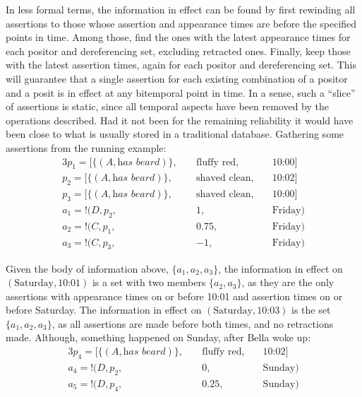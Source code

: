 \documentclass[sfsidenotes,nobib,twoside,symmetric]{tufte-handout}
\newcommand{\assert}{\text{!}}
\begin{document}
In less formal terms, the information in effect can be found by first rewinding all assertions to those whose assertion and appearance times are before the specified points in time. Among those, find the ones with the latest appearance times for each positor and dereferencing set, excluding retracted ones. Finally, keep those with the latest assertion times, again for each positor and dereferencing set. This will guarantee that a single assertion for each existing combination of a positor and a posit is in effect at any bitemporal point in time. In a sense, such a \enquote{slice} of assertions is static, since all temporal aspects have been removed by the operations described. Had it not been for the remaining reliability it would have been close to what is usually stored in a traditional database. Gathering some assertions from the running example:
\begin{alignat*}{3}
p_{1} = [\{(A, \textit{has beard})\},\;&& \textrm{fluffy red},\;&& \textrm{10:00}]  \\
p_{2} = [\{(A, \textit{has beard})\},\;&& \textrm{shaved clean},\;&& \textrm{10:02}]  \\
p_{3} = [\{(A, \textit{has beard})\},\;&& \textrm{shaved clean},\;&& \textrm{10:00}]  \\
a_1 = \assert(D, p_{2},\;&& 1,\;&& \textrm{Friday}) \\
a_2 = \assert(C, p_{1},\;&& 0.75,\;&& \textrm{Friday}) \\
a_3 = \assert(C, p_{3},\;&& -1,\;&& \textrm{Friday}) 
\end{alignat*}

Given the body of information above, $\{a_1, a_2, a_3\}$, the information in effect on $(\textrm{Saturday}, \textrm{10:01})$ is a set with two members $\{a_2, a_3\}$, as they are the only assertions with appearance times on or before 10:01 and assertion times on or before Saturday. The information in effect on $(\textrm{Saturday}, \textrm{10:03})$ is the set $\{a_1, a_2, a_3\}$, as all assertions are made before both times, and no retractions made. Although, something happened on Sunday, after Bella woke up:
\begin{alignat*}{3}
p_{4} = [\{(A, \textit{has beard})\},\;&& \textrm{fluffy red},\;&& \textrm{10:02}] \\
a_4 = \assert(D, p_{2},\;&& 0,\;&& \textrm{Sunday}) \\
a_5 = \assert(D, p_{4},\;&& 0.25,\;&& \textrm{Sunday}) 
\end{alignat*}
\end{document}
